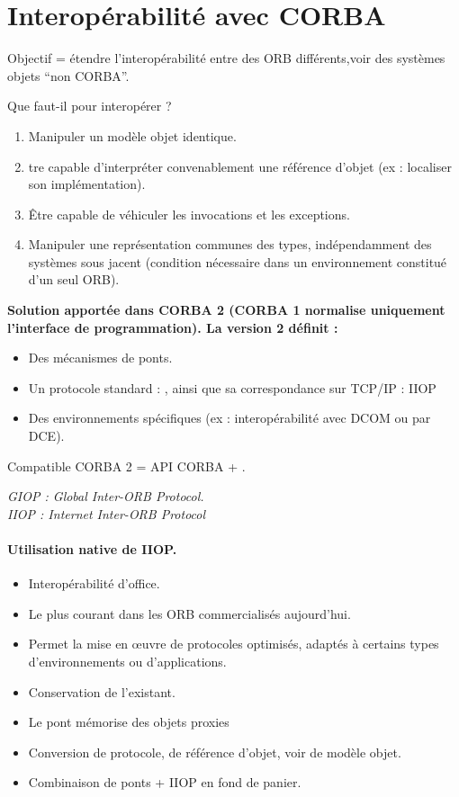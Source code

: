 \section{Interopérabilité avec CORBA}
    Objectif = étendre l’interopérabilité entre des ORB différents,voir des systèmes objets “non CORBA”.
    \par Que faut-il pour interopérer ?
    \begin{enumerate}
        \item Manipuler un modèle objet identique.
        \item tre capable d’interpréter convenablement une référence d’objet (ex : localiser son implémentation).
        \item Être capable de véhiculer les invocations et les exceptions.
        \item Manipuler une représentation communes des types, indépendamment des systèmes sous jacent (condition nécessaire dans un environnement constitué d’un seul ORB).
    \end{enumerate}
\vspace*{0.8cm}
 \textbf{Solution apportée dans CORBA 2 (CORBA 1 normalise uniquement l’interface de programmation). La version 2 définit :}
\begin{itemize}
    \item Des mécanismes de ponts.
    \item Un protocole standard : \cite{GIOP} , ainsi que sa correspondance sur TCP/IP : IIOP
    \item Des environnements spécifiques (ex : interopérabilité avec DCOM ou par DCE).
\end{itemize}

 Compatible CORBA 2 = API CORBA + \cite{IIOP}. 

\begin{flushleft}
\textit{GIOP : Global Inter-ORB Protocol.\\
IIOP : Internet Inter-ORB Protocol}
\end{flushleft}

\paragraph*{Utilisation native de IIOP.}
    \begin{itemize}
        \item Interopérabilité d’office.
        \item Le plus courant dans les ORB commercialisés aujourd’hui.
        \item Permet la mise en œuvre de protocoles optimisés, adaptés à certains types d’environnements ou d’applications.
        \item Conservation de l’existant.
        \item Le pont mémorise des objets proxies
        \item Conversion de protocole, de référence d’objet, voir de modèle objet.
        \item Combinaison de ponts + IIOP en fond de panier.
    \end{itemize}


